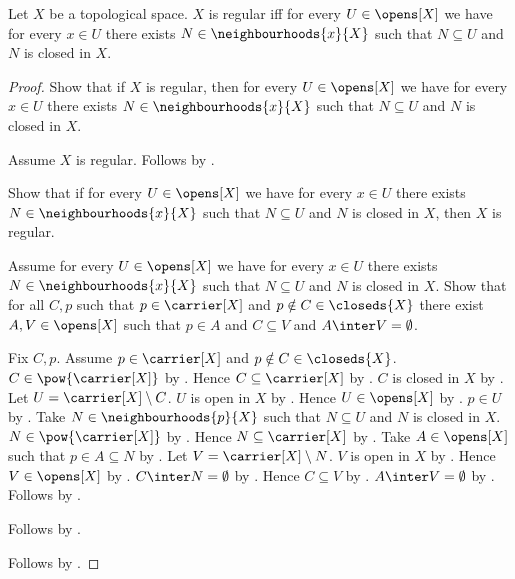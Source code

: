 \begin{theorem}\label{regular_iff_closed_neighbourhood_in_open}
    Let $X$ be a topological space.
    $X$ is regular iff for every $U\in\opens[X]$ we have for every $x\in U$
        there exists $N\in\neighbourhoods{x}{X}$ such that
        $N\subseteq U$ and $N$ is closed in $X$.
\end{theorem}
\begin{proof}
    Show that if $X$ is regular, then for every $U\in\opens[X]$ we have
        for every $x\in U$ there exists $N\in\neighbourhoods{x}{X}$ such that
        $N\subseteq U$ and $N$ is closed in $X$.
    \begin{subproof}
        Assume $X$ is regular.
        Follows by .
    \end{subproof}

    Show that if for every $U\in\opens[X]$ we have for every $x\in U$
        there exists $N\in\neighbourhoods{x}{X}$ such that
        $N\subseteq U$ and $N$ is closed in $X$, then $X$ is regular.
    \begin{subproof}
        Assume for every $U\in\opens[X]$ we have for every $x\in U$
            there exists $N\in\neighbourhoods{x}{X}$ such that
            $N\subseteq U$ and $N$ is closed in $X$.
        Show that for all $C,p$ such that $p\in\carrier[X]$ and
            $p\notin C\in\closeds{X}$ there exist $A,V\in\opens[X]$
            such that $p\in A$ and $C\subseteq V$ and
            $A\inter V=\emptyset$.
        \begin{subproof}
            Fix $C,p$.
            Assume $p\in\carrier[X]$ and $p\notin C\in\closeds{X}$.
            $C\in\pow{\carrier[X]}$ by .
            Hence $C\subseteq\carrier[X]$ by .
            $C$ is closed in $X$ by .
            Let $U=\carrier[X]\setminus C$.
            $U$ is open in $X$ by .
            Hence $U\in\opens[X]$ by .
            $p\in U$ by .
            Take $N\in\neighbourhoods{p}{X}$ such that $N\subseteq U$
                and $N$ is closed in $X$.
            $N\in\pow{\carrier[X]}$ by .
            Hence $N\subseteq\carrier[X]$ by .
            Take $A\in\opens[X]$ such that $p\in A\subseteq N$
                by .
            Let $V=\carrier[X]\setminus N$.
            $V$ is open in $X$ by .
            Hence $V\in\opens[X]$ by .
            $C\inter N=\emptyset$
                by .
            Hence $C\subseteq V$ by .
            $A\inter V=\emptyset$
                by .
            Follows by \auto.
        \end{subproof}
        Follows by .
    \end{subproof}
    Follows by \auto.
\end{proof}

